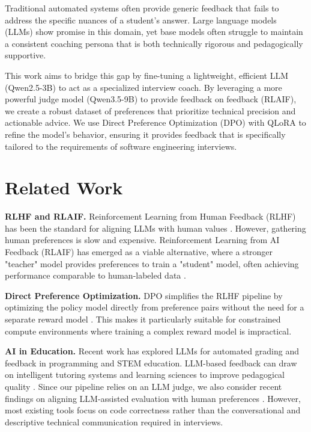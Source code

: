 \documentclass[10pt,twocolumn,letterpaper]{article}
\newcommand{\xhdr}[1]{\vspace{3pt}\noindent\textbf{#1}}
\begin{document}
Traditional automated systems often provide generic feedback that fails to address the specific nuances of a student's answer. Large language models (LLMs) show promise in this domain, yet base models often struggle to maintain a consistent coaching persona that is both technically rigorous and pedagogically supportive. 

This work aims to bridge this gap by fine-tuning a lightweight, efficient LLM (Qwen2.5-3B) to act as a specialized interview coach. By leveraging a more powerful judge model (Qwen3.5-9B) to provide feedback on feedback (RLAIF), we create a robust dataset of preferences that prioritize technical precision and actionable advice. We use Direct Preference Optimization (DPO) with QLoRA to refine the model's behavior, ensuring it provides feedback that is specifically tailored to the requirements of software engineering interviews.

\section{Related Work}
\label{sec:related}

\xhdr{RLHF and RLAIF.} Reinforcement Learning from Human Feedback (RLHF) has been the standard for aligning LLMs with human values \cite{ouyang2022instructgpt}. However, gathering human preferences is slow and expensive. Reinforcement Learning from AI Feedback (RLAIF) has emerged as a viable alternative, where a stronger "teacher" model provides preferences to train a "student" model, often achieving performance comparable to human-labeled data \cite{bai2022constitutional}.

\xhdr{Direct Preference Optimization.} DPO simplifies the RLHF pipeline by optimizing the policy model directly from preference pairs without the need for a separate reward model \cite{rafailov2023dpo}. This makes it particularly suitable for constrained compute environments where training a complex reward model is impractical.

\xhdr{AI in Education.} Recent work has explored LLMs for automated grading and feedback in programming and STEM education. LLM-based feedback can draw on intelligent tutoring systems and learning sciences to improve pedagogical quality \cite{stamper2024enhancing}. Since our pipeline relies on an LLM judge, we also consider recent findings on aligning LLM-assisted evaluation with human preferences \cite{shankar2024validators}. However, most existing tools focus on code correctness rather than the conversational and descriptive technical communication required in interviews.
\end{document}
